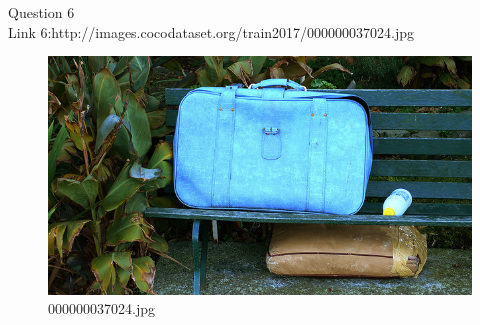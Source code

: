 Question 6\\
Link 6:http://images.cocodataset.org/train2017/000000037024.jpg
    \begin{figure}[h]
        \centering
        \includegraphics[width=0.8\linewidth]{../image set/easy/000000037024.jpg}
        \caption{000000037024.jpg}
    \end{figure}

